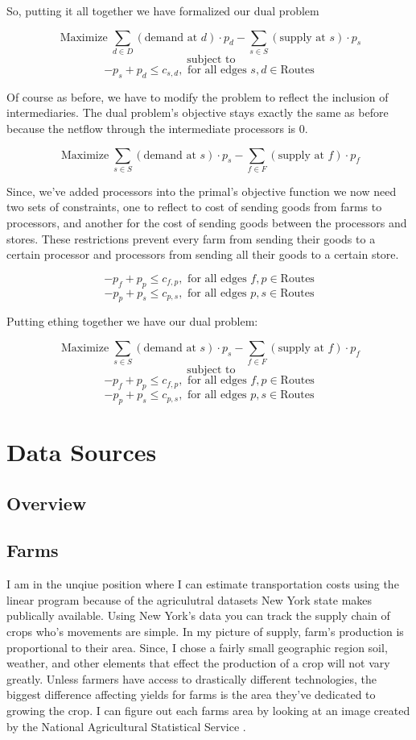 \documentclass{report}
\begin{document}
So, putting it all together we have formalized our dual problem

$$\operatorname{Maximize} \sum_{d \in D}  (\text{demand at } d) \cdot p_{d} -   \sum_{s \in S}  (\text{supply at } s) \cdot p_{s} $$
$$ \text{ subject to}$$
$$ -p_s + p_d \leq c_{s,d},  \text{ for all edges }  s,d\in \textrm{Routes}$$

Of course as before, we have to modify the problem to reflect the inclusion of intermediaries. The dual problem's objective stays exactly the same as before because the netflow through the intermediate processors is 0.

$$\operatorname{Maximize} \sum_{s \in S}  (\text{demand at } s) \cdot p_{s} -   \sum_{f \in F}  (\text{supply at } f) \cdot p_{f} $$

Since, we've added processors into the primal's objective function we now need two sets of constraints, one to reflect to cost of sending goods from farms to processors, and another for the cost of sending goods between the processors and stores. These restrictions  prevent every farm from sending their goods to a certain processor and processors from sending all their goods to a certain store.

$$ -p_f + p_p \leq c_{f,p}, \text{ for all edges }  f,p\in \textrm{Routes}$$
$$ -p_p + p_s \leq c_{p,s}, \text{ for all edges }  p,s\in \textrm{Routes}$$

Putting ething together we have our dual problem:

$$\operatorname{Maximize} \sum_{s \in S}  (\text{demand at } s) \cdot p_{s} -   \sum_{f \in F}  (\text{supply at } f) \cdot p_{f} $$
$$ \text{ subject to}$$
$$ -p_f + p_p \leq c_{f,p}, \text{ for all edges } f,p\in \textrm{Routes}$$
$$ -p_p + p_s \leq c_{p,s}, \text{ for all edges } p,s\in \textrm{Routes}$$

\chapter{Data Sources}

\section{Overview}

\section{Farms}

I am in the unqiue position where I can estimate transportation costs using the linear program because of the agriculutral datasets New York state makes publically available. Using New York's data you can track the supply chain of crops who's movements are simple. In my picture of supply, farm's production is proportional to their area. Since, I chose a fairly small geographic region soil, weather, and other elements that effect the production of a crop will not vary greatly. Unless farmers have access to drastically different technologies, the biggest difference affecting yields for farms is the area they've dedicated to growing the crop. I can figure out each farms area by looking at an image created by the National Agricultural Statistical Service \cite{nass}.
\end{document}
